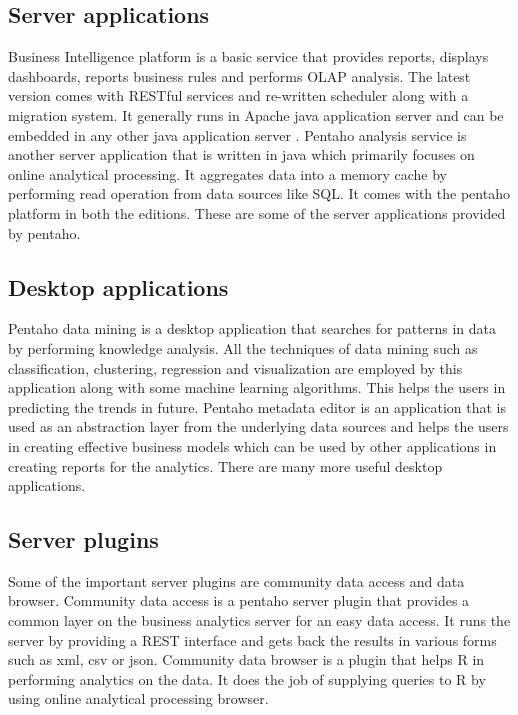 \documentclass[9pt,twocolumn,twoside]{../../styles/osajnl}
\begin{document}
\subsection{Server applications}

Business Intelligence platform is a basic service that provides
reports, displays dashboards, reports business rules and performs OLAP
analysis. The latest version comes with RESTful services and
re-written scheduler along with a migration system. It generally runs
in Apache java application server and can be embedded in any other
java application server \cite{pent1}. Pentaho analysis service is
another server application that is written in java which primarily
focuses on online analytical processing. It aggregates data into a
memory cache by performing read operation from data sources like
SQL. It comes with the pentaho platform in both the editions. These
are some of the server applications provided by pentaho.

\subsection{Desktop applications}

Pentaho data mining is a desktop application that searches for
patterns in data by performing knowledge analysis. All the techniques
of data mining such as classification, clustering, regression and
visualization are employed by this application along with some machine
learning algorithms. This helps the users in predicting the trends in
future. Pentaho metadata editor is an application that is used as an
abstraction layer from the underlying data sources and helps the users
in creating effective business models which can be used by other
applications in creating reports for the analytics. There are many
more useful desktop applications.
 
\subsection{Server plugins}

Some of the important server plugins are community data access and
data browser. Community data access is a pentaho server plugin that
provides a common layer on the business analytics server for an easy
data access. It runs the server by providing a REST interface and gets
back the results in various forms such as xml, csv or json. Community
data browser is a plugin that helps R in performing analytics on the
data. It does the job of supplying queries to R by using online
analytical processing browser.
\end{document}
